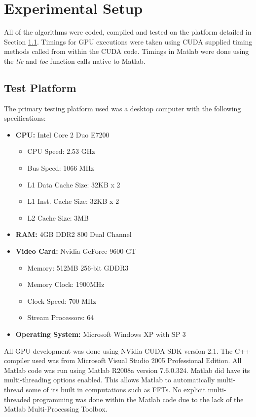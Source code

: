 \section{Experimental Setup}
\label{sect:gpu_experiment}
All of the algorithms were coded, compiled and tested on the platform detailed in Section \ref{sect:test_platform}.  Timings for GPU executions were taken using CUDA supplied timing methods called from within the CUDA code.  Timings in Matlab were done using the \textit{tic} and \textit{toc} function calls native to Matlab.

\subsection{Test Platform}
\label{sect:test_platform}
The primary testing platform used was a desktop computer with the following specifications:
\begin{itemize}
\item \textbf{CPU:} Intel Core 2 Duo E7200
	\begin{itemize}
	\item CPU Speed: 2.53 GHz
	\item Bus Speed: 1066 MHz
	\item L1 Data Cache Size: 32KB x 2
	\item L1 Inst. Cache Size: 32KB x 2
	\item L2 Cache Size: 3MB
	\end{itemize}
\item \textbf{RAM:} 4GB DDR2 800 Dual Channel
\item \textbf{Video Card:} Nvidia GeForce 9600 GT
	\begin{itemize}
	\item Memory: 512MB 256-bit GDDR3
	\item Memory Clock: 1900MHz
	\item Clock Speed: 700 MHz
	\item Stream Processors: 64
	\end{itemize}
\item \textbf{Operating System:} Microsoft Windows XP with SP 3
\end{itemize}

All GPU development was done using NVidia CUDA SDK version 2.1.  The C++ compiler used was from Microsoft Visual Studio 2005 Professional Edition.  All Matlab code was run using Matlab R2008a version 7.6.0.324.  Matlab did have its multi-threading options enabled.  This allows Matlab to automatically multi-thread some of its built in computations such as FFTs.  No explicit multi-threaded programming was done within the Matlab code due to the lack of the Matlab Multi-Processing Toolbox.

